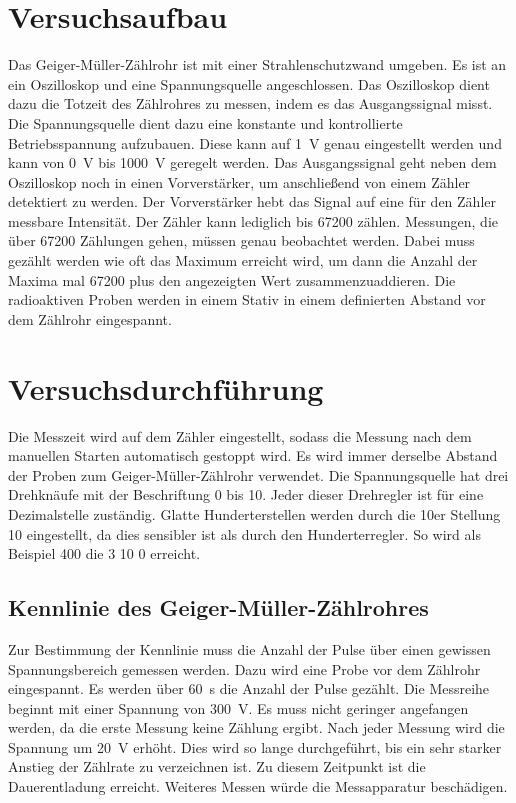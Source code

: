 %

%
\section{Versuchsaufbau}
Das Geiger-Müller-Zählrohr ist mit einer Strahlenschutzwand umgeben. Es ist an ein Oszilloskop und eine Spannungsquelle angeschlossen.
Das Oszilloskop dient dazu die Totzeit des Zählrohres zu messen, indem es das Ausgangssignal misst. Die Spannungsquelle dient dazu eine 
konstante und kontrollierte Betriebsspannung aufzubauen. Diese kann auf \qty{1}{\volt} genau eingestellt werden und kann von 
\qty{0}{\volt} bis \qty{1000}{\volt} geregelt werden. Das Ausgangssignal geht neben dem Oszilloskop noch in einen Vorverstärker, um 
anschließend von einem Zähler detektiert zu werden. Der Vorverstärker hebt das Signal auf eine für den Zähler messbare Intensität. Der 
Zähler kann lediglich bis 67200 zählen. Messungen, die über 67200 Zählungen gehen, müssen genau beobachtet werden. Dabei muss gezählt 
werden wie oft das Maximum erreicht wird, um dann die Anzahl der Maxima mal 67200 plus den angezeigten Wert zusammenzuaddieren. Die 
radioaktiven Proben werden in einem Stativ in einem definierten Abstand vor dem Zählrohr eingespannt.  


\section{Versuchsdurchführung}
Die Messzeit wird auf dem Zähler eingestellt, sodass die Messung nach dem manuellen Starten automatisch gestoppt wird. Es wird immer 
derselbe Abstand der Proben zum Geiger-Müller-Zählrohr verwendet. Die Spannungsquelle hat drei Drehknäufe mit der Beschriftung 0 bis 
10. Jeder dieser Drehregler ist für eine Dezimalstelle zuständig. Glatte Hunderterstellen werden durch die 10er Stellung 10 eingestellt, 
da dies sensibler ist als durch den Hunderterregler. So wird als Beispiel 400 die 3 10 0 erreicht.
\subsection{Kennlinie des Geiger-Müller-Zählrohres}
\noindent Zur Bestimmung der Kennlinie muss die Anzahl der Pulse über einen gewissen Spannungsbereich gemessen werden. Dazu wird eine Probe 
vor dem Zählrohr eingespannt. Es werden über \qty{60}{\second} die Anzahl der Pulse gezählt. Die Messreihe beginnt mit einer Spannung 
von \qty{300}{\volt}. Es muss nicht geringer angefangen werden, da die erste Messung keine Zählung ergibt. Nach jeder Messung wird 
die Spannung um \qty{20}{\volt} erhöht. Dies wird so lange durchgeführt, bis ein sehr starker Anstieg der Zählrate zu verzeichnen ist. 
Zu diesem Zeitpunkt ist die Dauerentladung erreicht. Weiteres Messen würde die Messapparatur beschädigen. 

